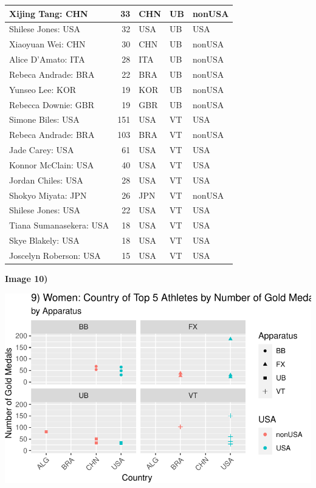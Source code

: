 \documentclass[
  10.5pt,
  letterpaper,
  DIV=11,
  numbers=noendperiod]{scrartcl}
\begin{document}
\begin{table}[H]
\begin{tabular}[t]{l|r|l|l|l}
\hline
Xijing Tang: CHN & 33 & CHN & UB & nonUSA\\
\hline
Shilese Jones: USA & 32 & USA & UB & USA\\
\hline
Xiaoyuan Wei: CHN & 30 & CHN & UB & nonUSA\\
\hline
Alice D'Amato: ITA & 28 & ITA & UB & nonUSA\\
\hline
Rebeca Andrade: BRA & 22 & BRA & UB & nonUSA\\
\hline
Yunseo Lee: KOR & 19 & KOR & UB & nonUSA\\
\hline
Rebecca Downie: GBR & 19 & GBR & UB & nonUSA\\
\hline
Simone Biles: USA & 151 & USA & VT & USA\\
\hline
Rebeca Andrade: BRA & 103 & BRA & VT & nonUSA\\
\hline
Jade Carey: USA & 61 & USA & VT & USA\\
\hline
Konnor McClain: USA & 40 & USA & VT & USA\\
\hline
Jordan Chiles: USA & 28 & USA & VT & USA\\
\hline
Shokyo Miyata: JPN & 26 & JPN & VT & nonUSA\\
\hline
Shilese Jones: USA & 22 & USA & VT & USA\\
\hline
Tiana Sumanasekera: USA & 18 & USA & VT & USA\\
\hline
Skye Blakely: USA & 18 & USA & VT & USA\\
\hline
Joscelyn Roberson: USA & 15 & USA & VT & USA\\
\hline
\end{tabular}
\end{table}

\textbf{Image 10)}

\includegraphics{Main_files/figure-pdf/unnamed-chunk-10-1.pdf}
\end{document}
